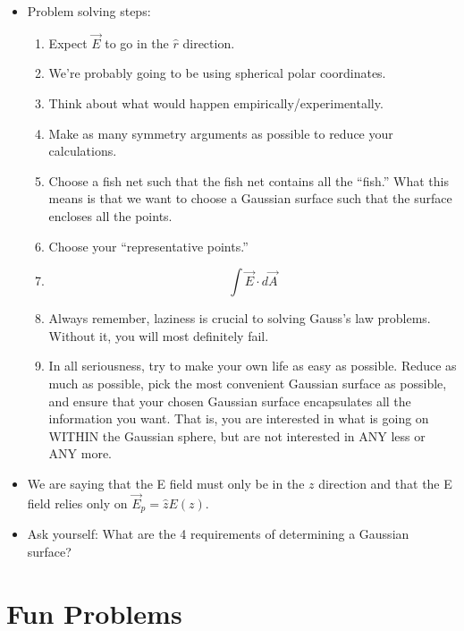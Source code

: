 \documentclass[12pt]{extreport}
\begin{document}
\begin{itemize}
		\item Problem solving steps:
		\begin{enumerate}
			\item Expect $\vec E$ to go in the $\hat r$ direction.
			\item We're probably going to be using spherical polar coordinates.
			\item Think about what would happen empirically/experimentally.
			\item Make as many symmetry arguments as possible to reduce your calculations.
			\item Choose a fish net such that the fish net contains all the ``fish.'' What this means is that we want to choose a Gaussian surface such that the surface encloses all the points.
			\item Choose your ``representative points.''
			\item $$\int \vec E \cdot d \vec A$$
			\item Always remember, laziness is crucial to solving Gauss's law problems. Without it, you will most definitely fail.
			\item In all seriousness, try to make your own life as easy as possible. Reduce as much as possible, pick the most convenient Gaussian surface as possible, and ensure that your chosen Gaussian surface encapsulates all the information you want. That is, you are interested in what is going on WITHIN the Gaussian sphere, but are not interested in ANY less or ANY more.
		\end{enumerate}

		\item We are saying that the E field must only be in the $z$ direction and that the E field relies only on $\vec E_p = \hat z E(z).$

		\item Ask yourself: What are the 4 requirements of determining a Gaussian surface?
	\end{itemize}


\chapter{Fun Problems}
\end{document}
